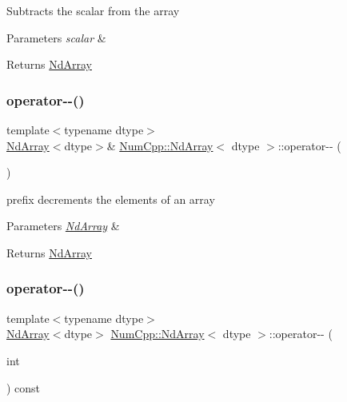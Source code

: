Subtracts the scalar from the array


\begin{DoxyParams}{Parameters}
{\em scalar} & \\
\hline
\end{DoxyParams}
\begin{DoxyReturn}{Returns}
\mbox{\hyperlink{class_num_cpp_1_1_nd_array}{Nd\+Array}} 
\end{DoxyReturn}
\mbox{\label{class_num_cpp_1_1_nd_array_a79070064dbee1bc428c0863b02be69b1}} 
\subsubsection{\texorpdfstring{operator-\/-\/()}{operator--()}\hspace{0.1cm}{\footnotesize\ttfamily [1/2]}}
{\footnotesize\ttfamily template$<$typename dtype$>$ \\
\mbox{\hyperlink{class_num_cpp_1_1_nd_array}{Nd\+Array}}$<$dtype$>$\& \mbox{\hyperlink{class_num_cpp_1_1_nd_array}{Num\+Cpp\+::\+Nd\+Array}}$<$ dtype $>$\+::operator-\/-\/ (\begin{DoxyParamCaption}{ }\end{DoxyParamCaption})\hspace{0.3cm}{\ttfamily [inline]}}

prefix decrements the elements of an array


\begin{DoxyParams}{Parameters}
{\em \mbox{\hyperlink{class_num_cpp_1_1_nd_array}{Nd\+Array}}} & \\
\hline
\end{DoxyParams}
\begin{DoxyReturn}{Returns}
\mbox{\hyperlink{class_num_cpp_1_1_nd_array}{Nd\+Array}} 
\end{DoxyReturn}
\mbox{\label{class_num_cpp_1_1_nd_array_afe9c56f2d5ff4d221d7842ef740b70e7}} 
\subsubsection{\texorpdfstring{operator-\/-\/()}{operator--()}\hspace{0.1cm}{\footnotesize\ttfamily [2/2]}}
{\footnotesize\ttfamily template$<$typename dtype$>$ \\
\mbox{\hyperlink{class_num_cpp_1_1_nd_array}{Nd\+Array}}$<$dtype$>$ \mbox{\hyperlink{class_num_cpp_1_1_nd_array}{Num\+Cpp\+::\+Nd\+Array}}$<$ dtype $>$\+::operator-\/-\/ (\begin{DoxyParamCaption}\item[{int}]{ }\end{DoxyParamCaption}) const\hspace{0.3cm}{\ttfamily [inline]}}

